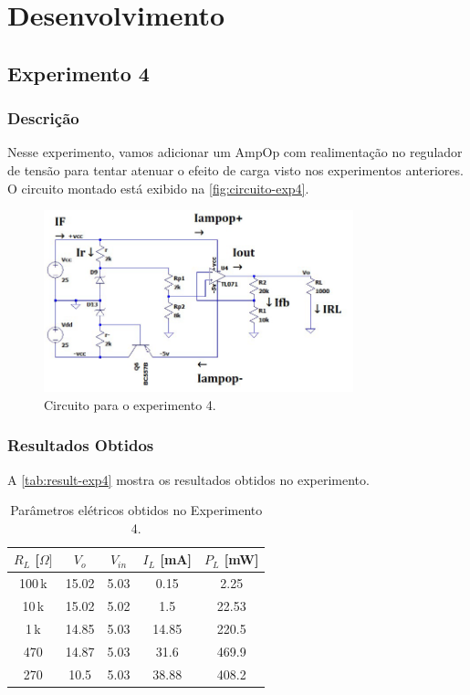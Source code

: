 \documentclass[
	12pt,				%
	oneside,			%
	a4paper,			%
	chapter=TITLE,
	sumario=tradicional,
	english,			%
	brazil				%
]{abntex2}
\begin{document}
\lipsum[1-2]

\chapter{Desenvolvimento}

\section{Experimento 4}

\subsection{Descrição}

Nesse experimento, vamos adicionar um AmpOp com realimentação no regulador de tensão 
para tentar atenuar o efeito de carga visto nos experimentos anteriores. 
O circuito montado está exibido na \autoref{fig:circuito-exp4}.

\begin{figure}[h!]
	\caption{\label{fig:circuito-exp4}Circuito para o experimento 4.}
	\begin{center}
    \includegraphics[width=0.8\textwidth,trim=1 1 1 1,clip]{images/circuito-exp4.png}
	\end{center}
\end{figure}

\subsection{Resultados Obtidos}

A \autoref{tab:result-exp4} mostra os resultados obtidos no experimento.

\begin{table}[htb]
	\caption{Parâmetros elétricos obtidos no Experimento 4.}
	\centering
	\begin{tabular}{c|c|c|c|c}
		\hline
		\textbf{$R_L$ [$\Omega]$} & \textbf{$V_{o}$} & \textbf{$V_{in}$} & \textbf{$I_L$ [mA]} & \textbf{$P_L$ [mW]} \\
		\hline
		100\,k & 15.02 & 5.03 & 0.15 & 2.25 \\
		10\,k  & 15.02 & 5.02 & 1.5 & 22.53 \\
		1\,k   & 14.85 & 5.03 & 14.85 & 220.5 \\
		470    & 14.87 & 5.03 & 31.6 & 469.9 \\
		270    & 10.5 & 5.03 & 38.88 & 408.2 \\
		\hline
	\end{tabular}
	\label{tab:result-exp4}
\end{table}
\end{document}

